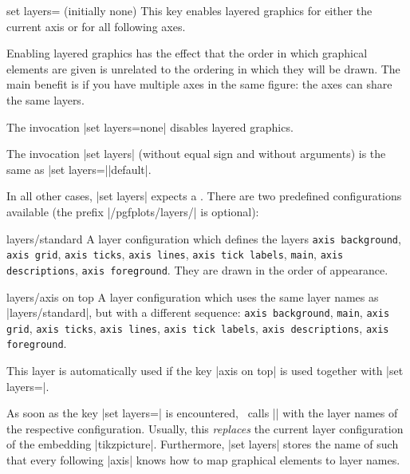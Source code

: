 {

\begin{pgfplotskey}{set layers= (initially none)}
   This key enables layered graphics for either the current axis or for all following axes. 

   Enabling layered graphics has the effect that the order in which graphical elements are given is unrelated to the ordering in which they will be drawn. The main benefit is if you have multiple axes in the same figure: the axes can share the same layers.

   The invocation |set layers=none| disables layered graphics.

   The invocation |set layers| (without equal sign and without arguments) is the same as |set layers=||default|.

   In all other cases, |set layers| expects a . There are two predefined configurations available (the prefix |/pgfplots/layers/| is optional):

   \begin{pgfplotskey}{layers/standard}
   	A layer configuration which defines the layers \texttt{axis background}, \texttt{axis grid}, \texttt{axis ticks}, \texttt{axis lines}, \texttt{axis tick labels}, \texttt{main}, \texttt{axis descriptions}, \texttt{axis foreground}. They are drawn in the order of appearance.
   \end{pgfplotskey}

   \begin{pgfplotskey}{layers/axis on top}
   	A layer configuration which uses the same layer names as |layers/standard|, but with a different sequence: \texttt{axis background}, \texttt{main}, \texttt{axis grid}, \texttt{axis ticks}, \texttt{axis lines}, \texttt{axis tick labels}, \texttt{axis descriptions}, \texttt{axis foreground}.

	This layer is automatically used if the key |axis on top| is used together with |set layers=|.
   \end{pgfplotskey}
  	
	As soon as the key |set layers=| is encountered, \PGFPlots\ calls |\pgfsetlayers| with the layer names of the respective configuration. Usually, this \emph{replaces} the current layer configuration of the embedding |tikzpicture|. Furthermore, |set layers| stores the name of  such that every following |axis| knows how to map graphical elements to layer names.
	

\end{pgfplotskey}}
